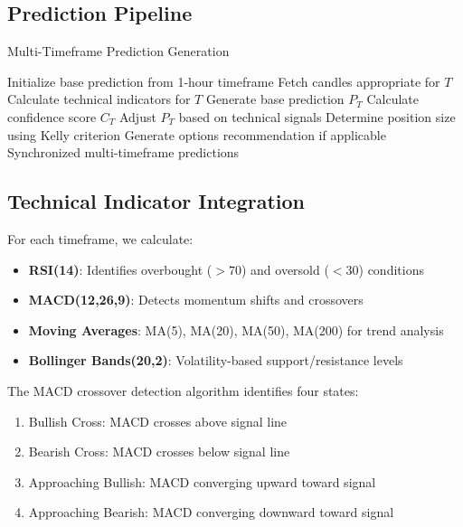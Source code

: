 \documentclass[12pt,a4paper]{article}
\begin{document}
\subsection{Prediction Pipeline}

\begin{algorithm}
\caption{Multi-Timeframe Prediction Generation}
\begin{algorithmic}[1]
\STATE Initialize base prediction from 1-hour timeframe
    \STATE Fetch candles appropriate for $T$
    \STATE Calculate technical indicators for $T$
    \STATE Generate base prediction $P_T$
    \STATE Calculate confidence score $C_T$
    \STATE Adjust $P_T$ based on technical signals
    \STATE Determine position size using Kelly criterion
    \STATE Generate options recommendation if applicable
\ENDFOR
\RETURN Synchronized multi-timeframe predictions
\end{algorithmic}
\end{algorithm}

\subsection{Technical Indicator Integration}

For each timeframe, we calculate:

\begin{itemize}
    \item \textbf{RSI(14)}: Identifies overbought ($>70$) and oversold ($<30$) conditions
    \item \textbf{MACD(12,26,9)}: Detects momentum shifts and crossovers
    \item \textbf{Moving Averages}: MA(5), MA(20), MA(50), MA(200) for trend analysis
    \item \textbf{Bollinger Bands(20,2)}: Volatility-based support/resistance levels
\end{itemize}

The MACD crossover detection algorithm identifies four states:
\begin{enumerate}
    \item Bullish Cross: MACD crosses above signal line
    \item Bearish Cross: MACD crosses below signal line
    \item Approaching Bullish: MACD converging upward toward signal
    \item Approaching Bearish: MACD converging downward toward signal
\end{enumerate}
\end{document}
